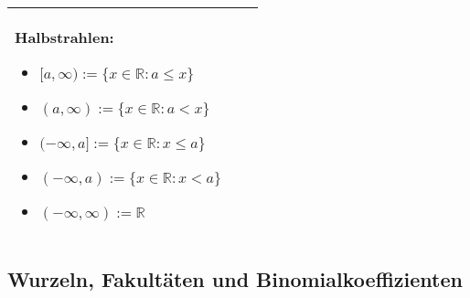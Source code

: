 \begin{longtable}{p{0.75cm} p{1cm} p{16cm}}
                        \textbf{Halbstrahlen:}
                        \begin{itemize}[topsep=-0.5cm]
                            \item $[a,\infty) := \{x \in \mathbb{R} : a \leq x\}$
                            \item $(a, \infty) := \{x \in \mathbb{R} : a < x\}$
                            \item $(-\infty, a] := \{x \in \mathbb{R}: x \leq a\}$
                            \item $(-\infty,a) := \{x \in \mathbb{R} : x < a\}$
                            \item $(-\infty,\infty):= \mathbb{R}$
                        \end{itemize} \vspace{-0cm} \\
        \bottomrule
        
    \end{longtable}

\subsection{Wurzeln, Fakultäten und Binomialkoeffizienten}
      
